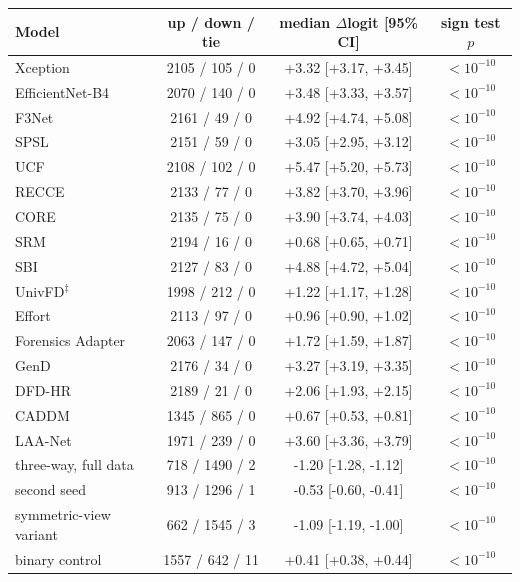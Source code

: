 \begin{tabular}{@{}l ccc@{}}
\toprule
Model & up / down / tie & median $\Delta$logit [95\% CI] & sign test $p$ \\
\midrule
Xception~\cite{xception} & 2105 / 105 / 0 & +3.32 [+3.17, +3.45] & $<10^{-10}$ \\
EfficientNet-B4~\cite{efficientnet} & 2070 / 140 / 0 & +3.48 [+3.33, +3.57] & $<10^{-10}$ \\
F3Net~\cite{f3net} & 2161 / 49 / 0 & +4.92 [+4.74, +5.08] & $<10^{-10}$ \\
SPSL~\cite{spsl} & 2151 / 59 / 0 & +3.05 [+2.95, +3.12] & $<10^{-10}$ \\
UCF~\cite{ucf} & 2108 / 102 / 0 & +5.47 [+5.20, +5.73] & $<10^{-10}$ \\
RECCE~\cite{recce} & 2133 / 77 / 0 & +3.82 [+3.70, +3.96] & $<10^{-10}$ \\
CORE~\cite{core} & 2135 / 75 / 0 & +3.90 [+3.74, +4.03] & $<10^{-10}$ \\
SRM~\cite{srm} & 2194 / 16 / 0 & +0.68 [+0.65, +0.71] & $<10^{-10}$ \\
SBI~\cite{sbi} & 2127 / 83 / 0 & +4.88 [+4.72, +5.04] & $<10^{-10}$ \\
UnivFD$^\ddagger$~\cite{univfd} & 1998 / 212 / 0 & +1.22 [+1.17, +1.28] & $<10^{-10}$ \\
Effort~\cite{effort} & 2113 / 97 / 0 & +0.96 [+0.90, +1.02] & $<10^{-10}$ \\
Forensics Adapter~\cite{forensicsadapter} & 2063 / 147 / 0 & +1.72 [+1.59, +1.87] & $<10^{-10}$ \\
GenD~\cite{gend2026} & 2176 / 34 / 0 & +3.27 [+3.19, +3.35] & $<10^{-10}$ \\
DFD-HR~\cite{dfdhr2026} & 2189 / 21 / 0 & +2.06 [+1.93, +2.15] & $<10^{-10}$ \\
CADDM~\cite{caddm} & 1345 / 865 / 0 & +0.67 [+0.53, +0.81] & $<10^{-10}$ \\
LAA-Net~\cite{laanet} & 1971 / 239 / 0 & +3.60 [+3.36, +3.79] & $<10^{-10}$ \\
\midrule
\ours{} three-way, full data & 718 / 1490 / 2 & -1.20 [-1.28, -1.12] & $<10^{-10}$ \\
\quad second seed & 913 / 1296 / 1 & -0.53 [-0.60, -0.41] & $<10^{-10}$ \\
\quad symmetric-view variant & 662 / 1545 / 3 & -1.09 [-1.19, -1.00] & $<10^{-10}$ \\
\ours{} binary control & 1557 / 642 / 11 & +0.41 [+0.38, +0.44] & $<10^{-10}$ \\

\end{tabular}
